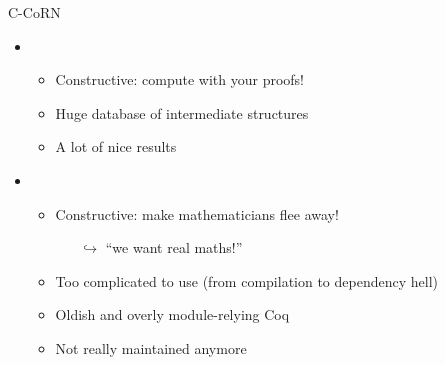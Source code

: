 \documentclass{beamer}
\begin{document}
\begin{frame}{C-CoRN}

\begin{itemize}
  \item \color{blue}{Pros}
  \begin{itemize}
    \item Constructive: compute with your proofs!
    \item Huge database of intermediate structures
    \item A lot of nice results
  \end{itemize}\pause
  \item \color{red}{Cons}
  \begin{itemize}
    \item Constructive: make mathematicians flee away!
    \begin{itemize}
      \item[$\hookrightarrow$] ``we want real maths!''
    \end{itemize}
    \item Too complicated to use (from compilation to dependency hell)
    \item Oldish and overly module-relying Coq
    \item Not really maintained anymore
  \end{itemize}
\end{itemize}


\end{frame}
\end{document}
